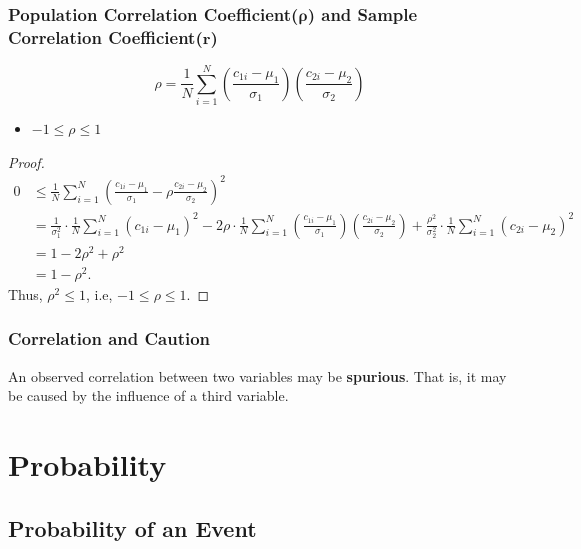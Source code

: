 \documentclass[12pt,a4paper]{article}
\begin{document}
\subsubsection{Population Correlation Coefficient($\boldsymbol{\rho}$) and Sample Correlation Coefficient($\boldsymbol{r}$)}

\begin{tcolorbox}[colback=white]
	\[
	\rho = \frac{1}{N}\sum_{i=1}^N\left(\frac{c_{1i}-\mu_1}{\sigma_1}\right)\left(\frac{c_{2i}-\mu_2}{\sigma_2}\right)
	\]
\end{tcolorbox}

\begin{tcolorbox}[colback=white]
	\begin{itemize}
		\item $-1\leq\rho\leq 1$
	\end{itemize}\tcblower\begin{proof}\begin{align*}
	0 &\leq \frac{1}{N}\sum_{i=1}^N\left(\frac{c_{1i}-\mu_1}{\sigma_1}-\rho\frac{c_{2i}-\mu_2}{\sigma_2}\right)^2\\
	&= \frac{1}{\sigma_1^2}\cdot\frac{1}{N}\sum_{i=1}^N(c_{1i}-\mu_1)^2-2\rho\cdot\frac{1}{N}\sum_{i=1}^N\left(\frac{c_{1i}-\mu_1}{\sigma_1}\right)\left(\frac{c_{2i}-\mu_2}{\sigma_2}\right)+\frac{\rho^2}{\sigma_2^2}\cdot\frac{1}{N}\sum_{i=1}^N(c_{2i}-\mu_2)^2 \\
	&=1-2\rho^2+\rho^2 \\
	&=1-\rho^2.
	\end{align*} Thus, $\rho^2\leq1$, i.e, $-1\leq\rho\leq 1$.
\end{proof}
\end{tcolorbox}

\subsubsection{Correlation and Caution}
\begin{tcolorbox}[colback=white]
	An observed correlation between two variables may be \textbf{spurious}. That is, it may be caused by the influence of a third variable.
\end{tcolorbox}


\section{Probability}

\subsection{Probability of an Event}
\end{document}

